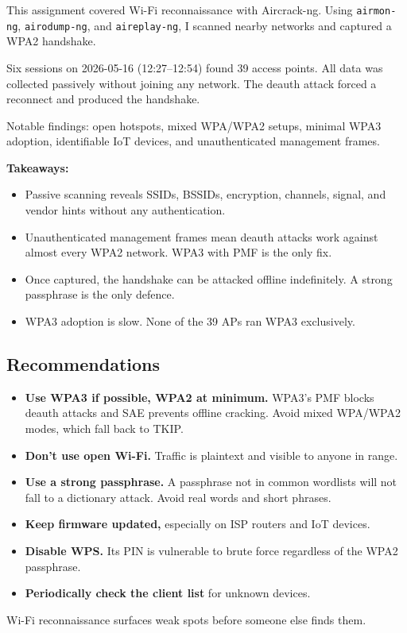 \documentclass[12pt,a4paper]{article}
\begin{document}
This assignment covered Wi-Fi reconnaissance with Aircrack-ng. Using \texttt{airmon-ng}, \texttt{airodump-ng}, and \texttt{aireplay-ng}, I scanned nearby networks and captured a WPA2 handshake.

Six sessions on 2026-05-16 (12:27--12:54) found 39 access points. All data was collected passively without joining any network. The deauth attack forced a reconnect and produced the handshake.

Notable findings: open hotspots, mixed WPA/WPA2 setups, minimal WPA3 adoption, identifiable IoT devices, and unauthenticated management frames.

\textbf{Takeaways:}

\begin{itemize}
    \item Passive scanning reveals SSIDs, BSSIDs, encryption, channels, signal, and vendor hints without any authentication.
    \item Unauthenticated management frames mean deauth attacks work against almost every WPA2 network. WPA3 with PMF is the only fix.
    \item Once captured, the handshake can be attacked offline indefinitely. A strong passphrase is the only defence.
    \item WPA3 adoption is slow. None of the 39 APs ran WPA3 exclusively.
\end{itemize}

\subsection{Recommendations}

\begin{itemize}
    \item \textbf{Use WPA3 if possible, WPA2 at minimum.} WPA3's PMF blocks deauth attacks and SAE prevents offline cracking. Avoid mixed WPA/WPA2 modes, which fall back to TKIP.
    \item \textbf{Don't use open Wi-Fi.} Traffic is plaintext and visible to anyone in range.
    \item \textbf{Use a strong passphrase.} A passphrase not in common wordlists will not fall to a dictionary attack. Avoid real words and short phrases.
    \item \textbf{Keep firmware updated,} especially on ISP routers and IoT devices.
    \item \textbf{Disable WPS.} Its PIN is vulnerable to brute force regardless of the WPA2 passphrase.
    \item \textbf{Periodically check the client list} for unknown devices.
\end{itemize}

Wi-Fi reconnaissance surfaces weak spots before someone else finds them.
\end{document}

